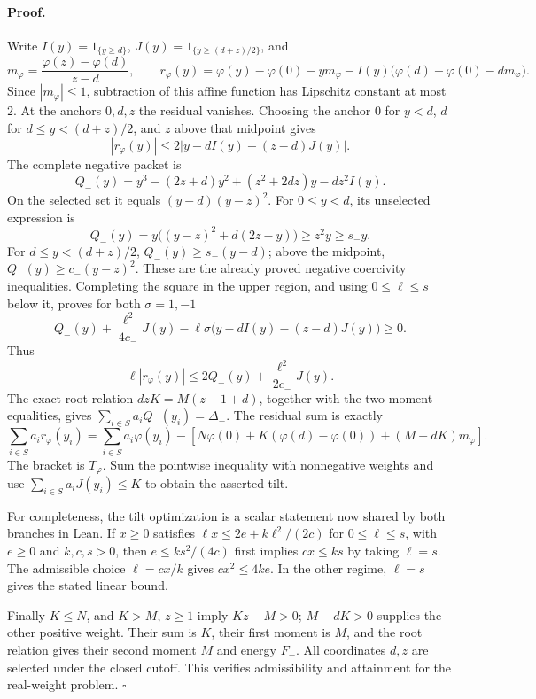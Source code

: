 \paragraph{Proof.}
Write \(I(y)=1_{\{y\ge d\}}\),
\(J(y)=1_{\{y\ge(d+z)/2\}}\), and
\[
 m_\varphi=\frac{\varphi(z)-\varphi(d)}{z-d},\qquad
 r_\varphi(y)=\varphi(y)-\varphi(0)-ym_\varphi
 -I(y)\bigl(\varphi(d)-\varphi(0)-dm_\varphi\bigr).
\]
Since \(|m_\varphi|\le1\), subtraction of this affine function
has Lipschitz constant at most \(2\).  At the anchors \(0,d,z\)
the residual vanishes.  Choosing the anchor \(0\) for \(y<d\),
\(d\) for \(d\le y<(d+z)/2\), and \(z\) above that midpoint gives
\[
 |r_\varphi(y)|
 \le2|y-dI(y)-(z-d)J(y)|.
\]
The complete negative packet is
\[
 Q_-(y)=y^3-(2z+d)y^2+(z^2+2dz)y-dz^2I(y).
\]
On the selected set it equals \((y-d)(y-z)^2\).
For \(0\le y<d\), its unselected expression is
\[
 Q_-(y)=y\bigl((y-z)^2+d(2z-y)\bigr)\ge z^2y\ge s_-y.
\]
For \(d\le y<(d+z)/2\), \(Q_-(y)\ge s_-(y-d)\);
above the midpoint, \(Q_-(y)\ge c_-(y-z)^2\).
These are the already proved negative coercivity inequalities.
Completing the square in the upper region, and using
\(0\le\ell\le s_-\) below it, proves for both \(\sigma=1,-1\)
\[
 Q_-(y)+\frac{\ell^2}{4c_-}J(y)
 -\ell\sigma\bigl(y-dI(y)-(z-d)J(y)\bigr)\ge0.
\]
Thus
\[
 \ell |r_\varphi(y)|
 \le2Q_-(y)+\frac{\ell^2}{2c_-}J(y).
\]
The exact root relation \(dzK=M(z-1+d)\), together with the two
moment equalities, gives
\(\sum_{i\in S}a_iQ_-(y_i)=\Delta_-\).
The residual sum is exactly
\[
 \sum_{i\in S}a_ir_\varphi(y_i)
 =\sum_{i\in S}a_i\varphi(y_i)
 -\left[N\varphi(0)+K(\varphi(d)-\varphi(0))
 +(M-dK)m_\varphi\right].
\]
The bracket is \(T_\varphi\).
Sum the pointwise inequality with nonnegative weights and use
\(\sum_{i\in S}a_iJ(y_i)\le K\) to obtain the asserted tilt.

For completeness, the tilt optimization is a scalar statement now shared
by both branches in Lean.  If \(x\ge0\) satisfies
\(\ell x\le2e+k\ell^2/(2c)\) for \(0\le\ell\le s\), with
\(e\ge0\) and \(k,c,s>0\), then \(e\le ks^2/(4c)\) first implies
\(cx\le ks\) by taking \(\ell=s\).
The admissible choice \(\ell=cx/k\) gives \(cx^2\le4ke\).
In the other regime, \(\ell=s\) gives the stated linear bound.

Finally \(K\le N\), and \(K>M\), \(z\ge1\) imply \(Kz-M>0\);
\(M-dK>0\) supplies the other positive weight.
Their sum is \(K\), their first moment is \(M\), and the root relation
gives their second moment \(M\) and energy \(F_-\).
All coordinates \(d,z\) are selected under the closed cutoff.
This verifies admissibility and attainment for the real-weight problem.
\hfill\(\square\)

